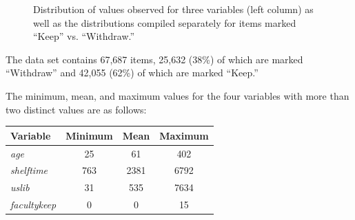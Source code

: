 \documentclass[man,11pt]{apa6}
\begin{document}
\begin{figure}
\caption{Distribution of values observed for three variables (left
  column) as well as the distributions compiled separately for items
  marked ``Keep'' vs. ``Withdraw.''}
\label{fig:dist}
\end{figure}

The data set contains 67,687 items, 25,632 (38\%) of which are marked
``Withdraw'' and 42,055 (62\%) of which are marked ``Keep.''  

The minimum, mean, and maximum values for the four variables with more
than two distinct values are as follows:

\singlespacing
\begin{center}
\begin{tabular}{|l|ccc|}
\hline
Variable & Minimum & Mean & Maximum \\
\hline
 {\em age} & 25 & 61 & 402 \\
 {\em shelftime} & 763 & 2381 & 6792 \\
 {\em uslib} & 31 & 535 & 7634  \\
 {\em facultykeep} & 0 & 0 & 15 \\
\hline
\end{tabular}
\end{center}
\doublespacing

\end{document}

